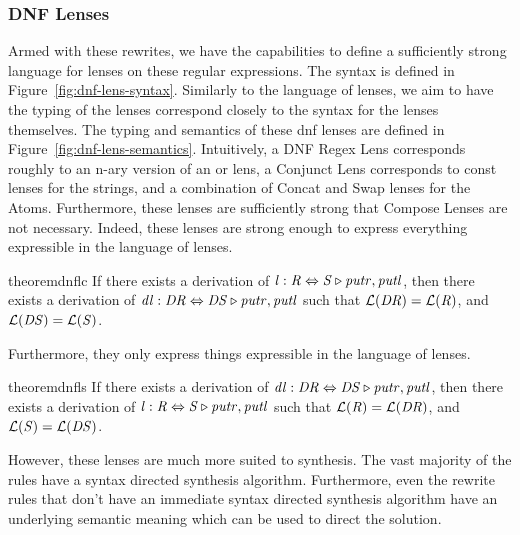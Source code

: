 \subsubsection{DNF Lenses}


Armed with these rewrites, we have the capabilities to define a sufficiently
strong language for lenses on these regular expressions.
The syntax is defined in Figure~\ref{fig:dnf-lens-syntax}.
Similarly to the language of lenses, we aim to have the typing of the lenses
correspond closely to the syntax for the lenses themselves.
The typing and semantics of these dnf lenses are defined in Figure~\ref{fig:dnf-lens-semantics}.
Intuitively, a DNF Regex Lens corresponds roughly to an n-ary version of an or lens,
a Conjunct Lens corresponds to const lenses for the strings, and a combination of
Concat and Swap lenses for the Atoms.
Furthermore, these lenses are sufficiently strong that Compose Lenses are not
necessary.
Indeed, these lenses are strong enough to express everything expressible in the language of lenses.
\begin{restatable}{theorem}{dnflc}
\label{thm:completeness-dnf-lenses}
If there exists a derivation of $\mathit{l} : \mathit{R} \Leftrightarrow \mathit{S} \triangleright \mathit{putr},\mathit{putl}$,
then there exists a derivation of $\mathit{dl} : \mathit{DR} \Leftrightarrow \mathit{DS} \triangleright \mathit{putr},\mathit{putl}$ such that
$\mathcal{L}(\mathit{DR})=\mathcal{L}(\mathit{R})$, and
$\mathcal{L}(\mathit{DS})=\mathcal{L}(\mathit{S})$.
\end{restatable}
Furthermore, they only express things expressible in the language of lenses.
\begin{restatable}{theorem}{dnfls}
\label{thm:soundness-dnf-lenses}
If there exists a derivation of $\mathit{dl} : \mathit{DR} \Leftrightarrow \mathit{DS} \triangleright \mathit{putr},\mathit{putl}$,
then there exists a derivation of $\mathit{l} : \mathit{R} \Leftrightarrow \mathit{S} \triangleright \mathit{putr},\mathit{putl}$ such that
$\mathcal{L}(\mathit{R})=\mathcal{L}(\mathit{DR})$, and
$\mathcal{L}(\mathit{S})=\mathcal{L}(\mathit{DS})$.
\end{restatable}

However, these lenses are much more suited to synthesis.
The vast majority of the rules have a syntax directed synthesis algorithm.
Furthermore, even the rewrite rules that don't have an immediate syntax directed
synthesis algorithm have an underlying semantic meaning which can be used
to direct the solution.

